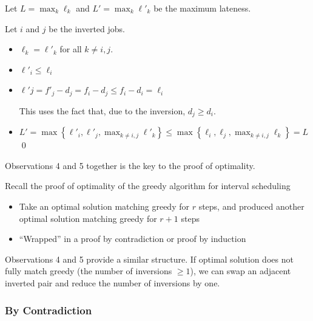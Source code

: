 \begin{itemize}
        Let $L = \max_k \ell_k$ and $L' = \max_k \ell'_k$ be the maximum lateness.

        Let $i$ and $j$ be the inverted jobs.

        \begin{itemize}
            \item $\ell_k = \ell'_k$ for all $k \ne i, j$.

            \item $\ell'_i \le \ell_i$

            \item $\ell'j = f'_j - d_j = f_i - d_j \le f_i - d_i = \ell_i$

            This uses the fact that, due to the inversion, $d_j \ge d_i$.

            \item $\displaystyle L' = \max\left\{\ell'_i, \ell'_j, \max_{k \ne i, j} \ell'_k\right\} \le \max\left\{\ell_i, \ell_j, \max_{k \ne i, j} \ell_k\right\} = L$ \qed
        \end{itemize}
\end{itemize}

Observations 4 and 5 together is the key to the proof of optimality.

\begin{remark}
    Recall the proof of optimality of the greedy algorithm for interval scheduling

    \begin{itemize}
        \item Take an optimal solution matching greedy for $r$ steps, and produced another optimal solution matching greedy for $r + 1$ steps
        \item ``Wrapped'' in a proof by contradiction or proof by induction
    \end{itemize}

    Observations 4 and 5 provide a similar structure. If optimal solution does not fully match greedy (the number of inversions $\ge 1$), we can swap an adjacent inverted pair and reduce the number of inversions by one.
\end{remark}

\subsubsection{By Contradiction}

